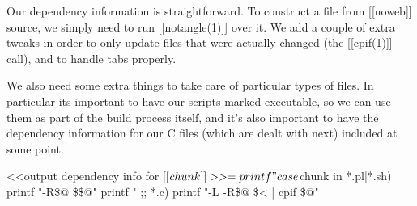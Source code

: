 \documentclass{article}
\begin{document}
Our dependency information is straightforward. To construct a file from
[[noweb]] source, we simply need to run [[notangle(1)]] over it. We add
a couple of extra tweaks in order to only update files that were actually
changed (the [[cpif(1)]] call), and to handle tabs properly.

We also need some extra things to take care of particular types of files.
In particular its important to have our scripts marked executable, so we
can use them as part of the build process itself, and it's also important
to have the dependency information for our C files (which are dealt with
next) included at some point.

<<output dependency info for [[$chunk]]>>=
printf "%
case $chunk in
	*.pl|*.sh)
		printf "\tnotangle -R\$@ \$< >\$@\n"
		printf " %
		;;
	*.c)
		printf "\tnotangle -L -R\$@ \$< | cpif \$@\n"
\end{document}
